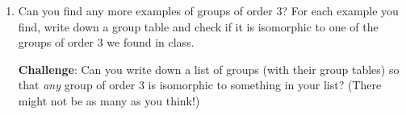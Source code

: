 \documentclass[10pt, letterpaper]{article}
\begin{document}
\begin{enumerate}
\item Can you find any more examples of groups of order $3$? For each
  example you find, write down a group table and check if it is
  isomorphic to one of the groups of order $3$ we found in class.

  \textbf{Challenge}: Can you write down a list of groups (with their
  group tables) so that \emph{any} group of order $3$ is isomorphic to
  something in your list? (There might not be as many as you think!)

\end{enumerate}
\end{document}
